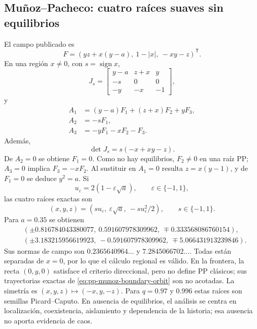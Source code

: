 \subsection{Muñoz--Pacheco: cuatro raíces suaves sin equilibrios}
\label{subsec:casegt-munoz}

El campo publicado es
\begin{equation}
 F=(yz+x(y-a),\ 1-|x|,\ -xy-z)^{\mathsf T}.
 \label{casegt:eq:munoz-field}
\end{equation}
En una región $x\ne0$, con $s=\operatorname{sign}x$,
\begin{equation}
 J_s=\begin{bmatrix}
 y-a&z+x&y\\
 -s&0&0\\
 -y&-x&-1
 \end{bmatrix},
 \label{casegt:eq:munoz-J}
\end{equation}
y
\begin{align}
 A_1&=(y-a)F_1+(z+x)F_2+yF_3,\nonumber\\
 A_2&=-sF_1,\\
 A_3&=-yF_1-xF_2-F_3.
 \label{casegt:eq:munoz-A}
\end{align}
Además,
\begin{equation}
 \det J_s=s(-x+xy-z).
 \label{casegt:eq:munoz-det}
\end{equation}
De $A_2=0$ se obtiene $F_1=0$. Como no hay equilibrios, $F_2\ne0$ en una
raíz PP; $A_3=0$ implica $F_3=-xF_2$. Al sustituir en $A_1=0$ resulta
$z=x(y-1)$, y de $F_1=0$ se deduce $y^2=a$. Si
\begin{equation}
 u_\varepsilon=2(1-\varepsilon\sqrt a),
 \qquad \varepsilon\in\{-1,1\},
 \label{casegt:eq:munoz-u}
\end{equation}
las cuatro raíces exactas son
\begin{equation}
 (x,y,z)=
 (s u_\varepsilon,\ \varepsilon\sqrt a,\
 -s u_\varepsilon^2/2),
 \qquad s\in\{-1,1\}.
 \label{casegt:eq:munoz-PP}
\end{equation}
Para $a=0.35$ se obtienen
\begin{align}
 &(\pm0.816784043380077,\ 0.591607978309962,
 \ \mp0.333568086760154),\nonumber\\
 &(\pm3.183215956619923,\ -0.591607978309962,
 \ \mp5.066431913239846).
 \label{casegt:eq:munoz-PP-numeric}
\end{align}
Sus normas de campo son $0.2365640964\ldots$ y $7.2845066702\ldots$. Todas
están separadas de $x=0$, por lo que el cálculo regional es válido. En la
frontera, la recta $(0,y,0)$ satisface el criterio direccional, pero no define
PP clásicos; sus trayectorias exactas de \cref{eq:pp-munoz-boundary-orbit}
son no acotadas. La simetría
es $(x,y,z)\mapsto(-x,y,-z)$. Para $q=0.97$ y $0.996$ estas raíces son semillas
Picard--Caputo. En ausencia de equilibrios, el análisis se centra en
localización, coexistencia, aislamiento y dependencia de la historia; esa
ausencia no aporta evidencia de caos.


